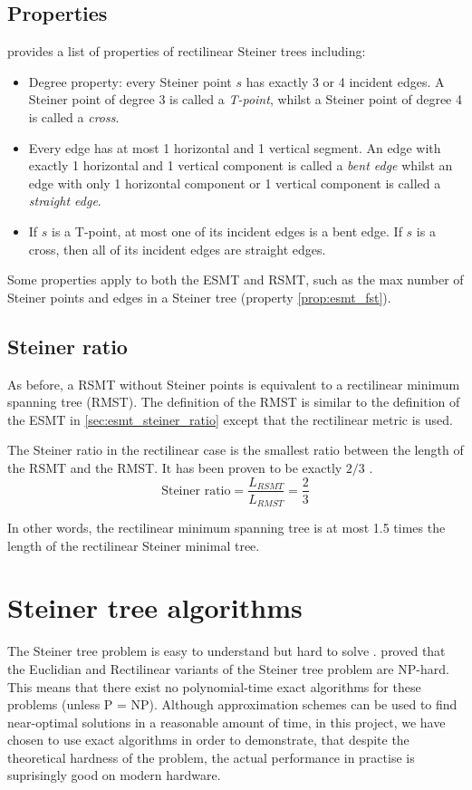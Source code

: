 \documentclass{l4proj}
\begin{document}
\subsection{Properties}
\cite{Brazil2015} provides a list of properties of rectilinear Steiner trees including:

\begin{itemize}
    \item Degree property: every Steiner point $s$ has exactly 3 or 4 incident edges. A Steiner point of degree 3 is called a \textit{T-point}, whilst a Steiner point of degree 4 is called a \textit{cross}.
    \item Every edge has at most 1 horizontal and 1 vertical segment. An edge with exactly 1 horizontal and 1 vertical component is called a \textit{bent edge} whilst an edge with only 1 horizontal component or 1 vertical component is called a \textit{straight edge}.
    \item If $s$ is a T-point, at most one of its incident edges is a bent edge. If $s$ is a cross, then all of its incident edges are straight edges.
\end{itemize}
\label{sec:rsmt_properties}
Some properties apply to both the ESMT and RSMT, such as the max number of Steiner points and edges in a Steiner tree (property \ref{prop:esmt_fst}).

\subsection{Steiner ratio}
As before, a RSMT without Steiner points is equivalent to a rectilinear minimum spanning tree (RMST). The definition of the RMST is similar to the definition of the ESMT in \ref{sec:esmt_steiner_ratio} except that the rectilinear metric is used.

The Steiner ratio in the rectilinear case is the smallest ratio between the length of the RSMT and the RMST. It has been proven to be exactly $2/3$ \cite{Brazil2015}.
$$
    \text{Steiner ratio} = \frac{L_{RSMT}}{L_{RMST}} = \frac{2}{3}
$$

In other words, the rectilinear minimum spanning tree is at most 1.5 times the length of the rectilinear Steiner minimal tree.

\section{Steiner tree algorithms}
\label{sec:algorithms}
The Steiner tree problem is easy to understand but hard to solve \citep{Brazil2015}. \cite{Garey1977} proved that the Euclidian and Rectilinear variants of the Steiner tree problem are NP-hard. This means that there exist no polynomial-time exact algorithms for these problems (unless P = NP).
Although approximation schemes can be used to find near-optimal solutions in a reasonable amount of time, in this project, we have chosen to use exact algorithms in order to demonstrate, that despite the theoretical hardness of the problem, the actual performance in practise is suprisingly good on modern hardware.
\end{document}
